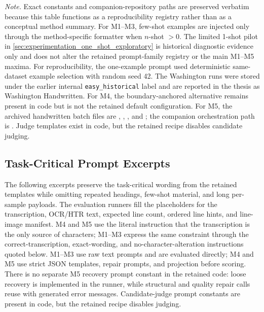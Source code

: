 \begin{table}[H]
  \parbox{0.96\linewidth}{\footnotesize\raggedright \textit{Note.} Exact constants and companion-repository paths are preserved verbatim because this table functions as a reproducibility registry rather than as a conceptual method summary. For M1--M3, few-shot examples are injected only through the method-specific formatter when \(n\)\nobreakdash-shot \(>0\). The limited 1-shot pilot in \autoref{sec:experimentation_one_shot_exploratory} is historical diagnostic evidence only and does not alter the retained prompt-family registry or the main M1--M5 maxima. For reproducibility, the one-example prompt used deterministic same-dataset example selection with random seed 42. The Washington runs were stored under the earlier internal \texttt{easy\_historical} label and are reported in the thesis as Washington Handwritten. For M4, the boundary-anchored alternative remains present in code but is not the retained default configuration. For M5, the archived handwritten batch files are , , , and ; the companion orchestration path is . Judge templates exist in code, but the retained recipe disables candidate judging.}
\end{table}

\subsection{Task-Critical Prompt Excerpts}
\label{sec:appendix_prompt_excerpts}

The following excerpts preserve the task-critical wording from the retained templates while omitting repeated headings, few-shot material, and long per-sample payloads. The evaluation runners fill the placeholders for the transcription, OCR/HTR text, expected line count, ordered line hints, and line-image manifest. M4 and M5 use the literal instruction that the transcription is the only source of characters; M1--M3 express the same constraint through the correct-transcription, exact-wording, and no-character-alteration instructions quoted below. M1--M3 use raw text prompts and are evaluated directly; M4 and M5 use strict JSON templates, repair prompts, and projection before scoring. There is no separate M5 recovery prompt constant in the retained code: loose recovery is implemented in the runner, while structural and quality repair calls reuse  with generated error messages. Candidate-judge prompt constants are present in code, but the retained \contextHundred{} recipe disables judging.

